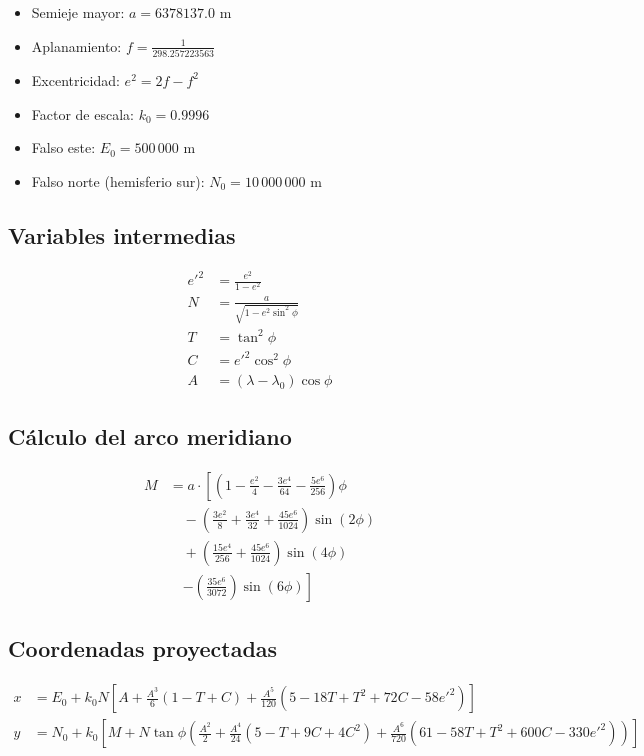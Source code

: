 \documentclass[12pt]{article}
\begin{document}
\begin{itemize}
  \item Semieje mayor: $a = 6378137.0$ m
  \item Aplanamiento: $f = \frac{1}{298.257223563}$
  \item Excentricidad: $e^2 = 2f - f^2$
  \item Factor de escala: $k_0 = 0.9996$
  \item Falso este: $E_0 = 500\,000$ m
  \item Falso norte (hemisferio sur): $N_0 = 10\,000\,000$ m
\end{itemize}

\subsection*{Variables intermedias}

\begin{align*}
e'^2 &= \frac{e^2}{1 - e^2} \\
N &= \frac{a}{\sqrt{1 - e^2 \sin^2 \phi}} \\
T &= \tan^2 \phi \\
C &= e'^2 \cos^2 \phi \\
A &= (\lambda - \lambda_0) \cos \phi
\end{align*}

\subsection*{Cálculo del arco meridiano}

\begin{align*}
M &= a \cdot \left[
(1 - \frac{e^2}{4} - \frac{3e^4}{64} - \frac{5e^6}{256}) \phi \right. \\
&\quad - (\frac{3e^2}{8} + \frac{3e^4}{32} + \frac{45e^6}{1024}) \sin(2\phi) \\
&\quad + (\frac{15e^4}{256} + \frac{45e^6}{1024}) \sin(4\phi) \\
&\quad \left. - (\frac{35e^6}{3072}) \sin(6\phi)
\right]
\end{align*}

\subsection*{Coordenadas proyectadas}

\begin{align*}
x &= E_0 + k_0 N \left[ A + \frac{A^3}{6}(1 - T + C) + \frac{A^5}{120}(5 - 18T + T^2 + 72C - 58e'^2) \right] \\
y &= N_0 + k_0 \left[ M + N \tan \phi \left( \frac{A^2}{2} + \frac{A^4}{24}(5 - T + 9C + 4C^2) + \frac{A^6}{720}(61 - 58T + T^2 + 600C - 330e'^2) \right) \right]
\end{align*}
\end{document}
